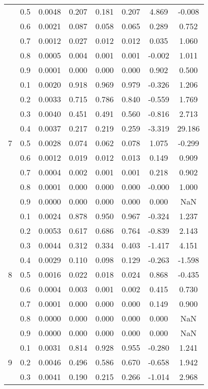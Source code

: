 \documentclass[11pt,a4paper]{report}
\begin{document}
\begin{longtable}{ | c | c || c | c | c | c | c | c | }
 & 0.5 & 0.0048 & 0.207 & 0.181 & 0.207 & 4.869 & -0.008 \\
 & 0.6 & 0.0021 & 0.087 & 0.058 & 0.065 & 0.289 & 0.752 \\
 & 0.7 & 0.0012 & 0.027 & 0.012 & 0.012 & 0.035 & 1.060 \\
 & 0.8 & 0.0005 & 0.004 & 0.001 & 0.001 & -0.002 & 1.011 \\
 & 0.9 & 0.0001 & 0.000 & 0.000 & 0.000 & 0.902 & 0.500 \\
 \hline
\multirow{9}{*}{7} & 0.1 & 0.0020 & 0.918 & 0.969 & 0.979 & -0.326 & 1.206 \\
 & 0.2 & 0.0033 & 0.715 & 0.786 & 0.840 & -0.559 & 1.769 \\
 & 0.3 & 0.0040 & 0.451 & 0.491 & 0.560 & -0.816 & 2.713 \\
 & 0.4 & 0.0037 & 0.217 & 0.219 & 0.259 & -3.319 & 29.186 \\
 & 0.5 & 0.0028 & 0.074 & 0.062 & 0.078 & 1.075 & -0.299 \\
 & 0.6 & 0.0012 & 0.019 & 0.012 & 0.013 & 0.149 & 0.909 \\
 & 0.7 & 0.0004 & 0.002 & 0.001 & 0.001 & 0.218 & 0.902 \\
 & 0.8 & 0.0001 & 0.000 & 0.000 & 0.000 & -0.000 & 1.000 \\
 & 0.9 & 0.0000 & 0.000 & 0.000 & 0.000 & 0.000 & NaN \\
 \hline
\multirow{9}{*}{8} & 0.1 & 0.0024 & 0.878 & 0.950 & 0.967 & -0.324 & 1.237 \\
 & 0.2 & 0.0053 & 0.617 & 0.686 & 0.764 & -0.839 & 2.143 \\
 & 0.3 & 0.0044 & 0.312 & 0.334 & 0.403 & -1.417 & 4.151 \\
 & 0.4 & 0.0029 & 0.110 & 0.098 & 0.129 & -0.263 & -1.598 \\
 & 0.5 & 0.0016 & 0.022 & 0.018 & 0.024 & 0.868 & -0.435 \\
 & 0.6 & 0.0004 & 0.003 & 0.001 & 0.002 & 0.415 & 0.730 \\
 & 0.7 & 0.0001 & 0.000 & 0.000 & 0.000 & 0.149 & 0.900 \\
 & 0.8 & 0.0000 & 0.000 & 0.000 & 0.000 & 0.000 & NaN \\
 & 0.9 & 0.0000 & 0.000 & 0.000 & 0.000 & 0.000 & NaN \\
 \hline
\multirow{9}{*}{9} & 0.1 & 0.0031 & 0.814 & 0.928 & 0.955 & -0.280 & 1.241 \\
 & 0.2 & 0.0046 & 0.496 & 0.586 & 0.670 & -0.658 & 1.942 \\
 & 0.3 & 0.0041 & 0.190 & 0.215 & 0.266 & -1.014 & 2.968 \\

\end{longtable}
\end{document}
